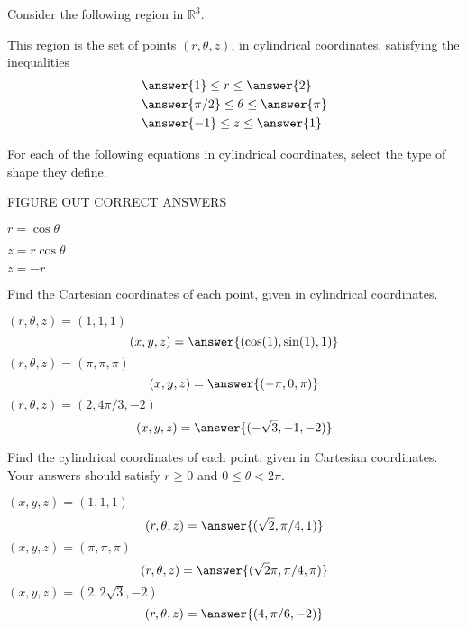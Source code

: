 \documentclass{ximera}
\begin{document}
\begin{problem}
Consider the following region in $\mathbb{R}^3$.


This region is the set of points $(r, \theta, z)$, in cylindrical coordinates, satisfying the inequalities
\begin{align*}
&\answer{1}\leq r\leq \answer{2}\\
&\answer{\pi/2}\leq\theta\leq\answer{\pi}\\
&\answer{-1}\leq z\leq\answer{1}
\end{align*}

\end{problem}

\begin{problem}
For each of the following equations in cylindrical coordinates, select the type of shape they define.

FIGURE OUT CORRECT ANSWERS

$r = \cos\theta$
\begin{multipleChoice}
\end{multipleChoice}

$z = r\cos\theta$
\begin{multipleChoice}
\end{multipleChoice}

$z = -r$
\begin{multipleChoice}
\end{multipleChoice}
\end{problem}

\begin{problem}
Find the Cartesian coordinates of each point, given in cylindrical coordinates.

$(r,\theta,z) = (1,1,1)$
\[
(x,y,z) = \answer{(\cos(1), \sin(1), 1)}
\]
$(r,\theta,z) = (\pi,\pi,\pi)$
\[
(x,y,z) = \answer{(-\pi, 0, \pi)}
\]
$(r,\theta,z) = (2,4\pi/3,-2)$
\[
(x,y,z) = \answer{(-\sqrt{3}, -1, -2)}
\]
\end{problem}

\begin{problem}
Find the cylindrical coordinates of each point, given in Cartesian coordinates. Your answers should satisfy $r\geq 0$ and $0\leq \theta < 2\pi$.

$(x,y,z) = (1,1,1)$
\[
(r,\theta,z) = \answer{(\sqrt{2}, \pi/4, 1)}
\]
$(x,y,z) = (\pi,\pi,\pi)$
\[
(r,\theta,z) = \answer{(\sqrt{2}\pi, \pi/4, \pi)}
\]
$(x,y,z) = (2,2\sqrt{3},-2)$
\[
(r,\theta,z) = \answer{(4, \pi/6, -2)}
\]
\end{problem}
\end{document}
